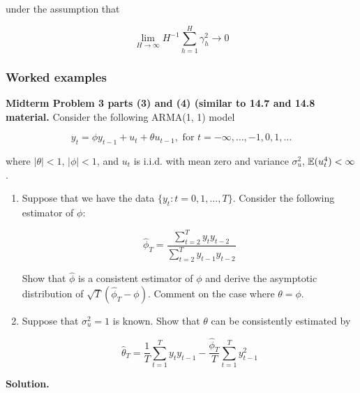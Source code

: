 under the assumption that 

\[
\lim_{H \to \infty} H^{-1} \sum_{h=1}^H \gamma_h^2 \to 0
\]


\subsubsection{Worked examples}

\textbf{Midterm Problem 3 parts (3) and (4) (similar to 14.7 and 14.8 material.} Consider the following ARMA(1, 1) model

\[
y_t = \phi y_{t-1} + u_t + \theta u_{t-1}, \text{ for } t = - \infty, \ldots, -1, 0 , 1, \ldots
\]

where \(|\theta| < 1\), \(|\phi| < 1\), and \(u_t\) is i.i.d. with mean zero and variance \(\sigma_u^2\), \(\mathbb{E}(u_t^4) < \infty\).

\begin{enumerate}[(1)]

\item Suppose that we have the data \(\{y_t : t = 0, 1, \ldots, T\} \). Consider the following estimator of \(\phi\):

\[
\hat{\phi}_T = \frac{\sum_{t=2}^T y_t y_{t-2}}{\sum_{t=2}^T y_{t-1} y_{t-2}}
\]

Show that \(\hat{\phi}\) is a consistent estimator of \(\phi\) and derive the asymptotic distribution of \(\sqrt{T}(\hat{\phi}_T - \phi)\). Comment on the case where \(\theta = \phi\).

\item Suppose that \(\sigma_u^2 = 1\) is known. Show that \(\theta\) can be consistently estimated by 

\[
\hat{\theta}_T = \frac{1}{T} \sum_{t=1}^T y_t y_{t-1} - \frac{\hat{\phi}_T}{T}\sum_{t=1}^T y_{t-1}^2
\]

\end{enumerate}

\textbf{Solution.}

